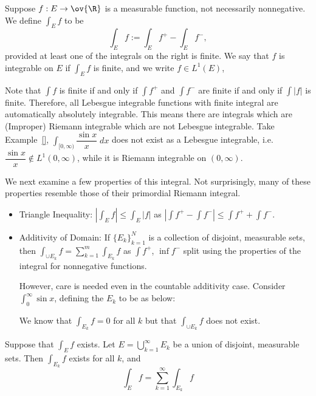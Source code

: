 \begin{dfn}
Suppose $f: E \to \ov{\R}$ is a measurable function, not necessarily nonnegative. We define $\int_E f$ to be
	\[
	\int_E f:= \int_E f^+ - \int_E f^-,
	\]
provided at least one of the integrals on the right is finite. We say that $f$ is integrable on $E$ if $\int_E f$ is finite, and we write $f \in L^1(E)$, 
\end{dfn}


\begin{rem}
Note that $\int f$ is finite if and only if $\int f^+$ and $\int f^-$ are finite if and only if $\int |f|$ is finite. Therefore, all Lebesgue integrable functions with finite integral are automatically absolutely integrable. This means there are integrals which are (Improper) Riemann integrable which are not Lebesgue integrable. Take Example~\ref{}, $\int_{[0,\infty)} \dfrac{\sin x}{x} \; dx$ does not exist as a Lebesgue integrable, i.e. $\dfrac{\sin x}{x} \notin L^1(0,\infty)$, while it is Riemann integrable on $(0,\infty)$. 
\end{rem}


We next examine a few properties of this integral. Not surprisingly, many of these properties resemble those of their primordial Riemann integral. 

\begin{itemize}
\item Triangle Inequality: $\left| \int_E f \right| \leq \int_E |f|$ as $\left| \int f^+ - \int f^- \right| \leq \int f^+ + \int f^-$.

\item Additivity of Domain: If $\{E_k\}_{k=1}^N$ is a collection of disjoint, measurable sets, then $\int_{\cup E_k} f = \sum_{k=1}^m \int_{E_k} f$ as $\int f^+$, $\inf f^-$ split using the properties of the integral for nonnegative functions. 

However, care is needed even in the countable additivity case. Consider $\int_0^\infty \sin x$, defining the $E_k$ to be as below:


We know that $\int_{E_k} f= 0$ for all $k$ but that $\int_{\cup E_k} f$ does not exist. 
\end{itemize}


\begin{lem}
Suppose that $\int_E f$ exists. Let $E= \bigcup_{k=1}^\infty E_k$ be a union of disjoint, measurable sets. Then $\int_{E_k} f$ exists for all $k$, and 
	\[
	\int_E f= \sum_{k=1}^\infty \int_{E_k} f
	\]
\end{lem}

